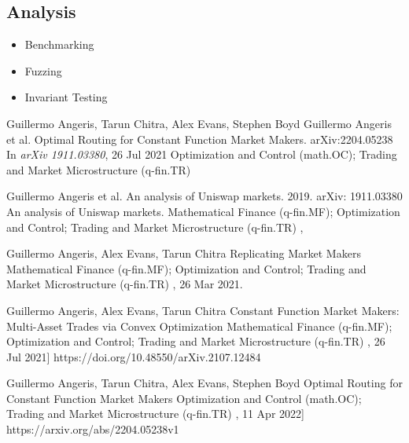 \documentclass{article}
\begin{document}
\subsection{Analysis}
\begin{itemize}
	\item Benchmarking
	\item Fuzzing
	\item Invariant Testing
\end{itemize}



\begin{thebibliography}{1}
	Guillermo Angeris, Tarun Chitra, Alex Evans, Stephen Boyd
	\newblock Guillermo Angeris et al. Optimal Routing for Constant Function Market Makers.	arXiv:2204.05238
	\newblock In {\em arXiv 1911.03380}, 26 Jul 2021
	Optimization and Control (math.OC); Trading and Market Microstructure (q-fin.TR)


	Guillermo Angeris et al. An analysis of Uniswap markets. 2019. arXiv: 1911.03380
	\newblock An analysis of Uniswap markets.
	Mathematical Finance (q-fin.MF); Optimization and Control; Trading and Market Microstructure (q-fin.TR)
	,

	Guillermo Angeris, Alex Evans, Tarun Chitra
	\newblock Replicating Market Makers
	Mathematical Finance (q-fin.MF); Optimization and Control; Trading and Market Microstructure (q-fin.TR)
	, 26 Mar 2021.


	Guillermo Angeris, Alex Evans, Tarun Chitra
	\newblock Constant Function Market Makers: Multi-Asset Trades via Convex Optimization
	Mathematical Finance (q-fin.MF); Optimization and Control; Trading and Market Microstructure (q-fin.TR)
	, 26 Jul 2021]
	https://doi.org/10.48550/arXiv.2107.12484


	Guillermo Angeris, Tarun Chitra, Alex Evans, Stephen Boyd
	\newblock Optimal Routing for Constant Function Market Makers
	Optimization and Control (math.OC); Trading and Market Microstructure (q-fin.TR)
	, 11 Apr 2022]
	https://arxiv.org/abs/2204.05238v1

\end{thebibliography}
\end{document}
